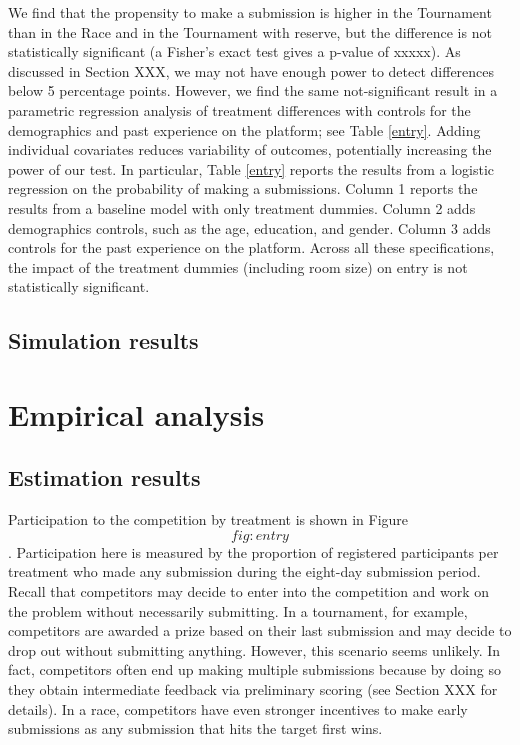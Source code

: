 \documentclass[12pt,]{article}
\begin{document}
We find that the propensity to make a submission is higher in the
Tournament than in the Race and in the Tournament with reserve, but the
difference is not statistically significant (a Fisher's exact test gives
a p-value of xxxxx). As discussed in Section XXX, we may not have enough
power to detect differences below 5 percentage points. However, we find
the same not-significant result in a parametric regression analysis of
treatment differences with controls for the demographics and past
experience on the platform; see Table \ref{entry}. Adding individual
covariates reduces variability of outcomes, potentially increasing the
power of our test. In particular, Table \ref{entry} reports the results
from a logistic regression on the probability of making a submissions.
Column 1 reports the results from a baseline model with only treatment
dummies. Column 2 adds demographics controls, such as the age,
education, and gender. Column 3 adds controls for the past experience on
the platform. Across all these specifications, the impact of the
treatment dummies (including room size) on entry is not statistically
significant.

\subsection{Simulation results}\label{simulation-results}

\section{Empirical analysis}\label{empirical-analysis}

\subsection{Estimation results}\label{estimation-results-1}

Participation to the competition by treatment is shown in Figure
\[fig:entry\]. Participation here is measured by the proportion of
registered participants per treatment who made any submission during the
eight-day submission period. Recall that competitors may decide to enter
into the competition and work on the problem without necessarily
submitting. In a tournament, for example, competitors are awarded a
prize based on their last submission and may decide to drop out without
submitting anything. However, this scenario seems unlikely. In fact,
competitors often end up making multiple submissions because by doing so
they obtain intermediate feedback via preliminary scoring (see Section
XXX for details). In a race, competitors have even stronger incentives
to make early submissions as any submission that hits the target first
wins.
\end{document}
